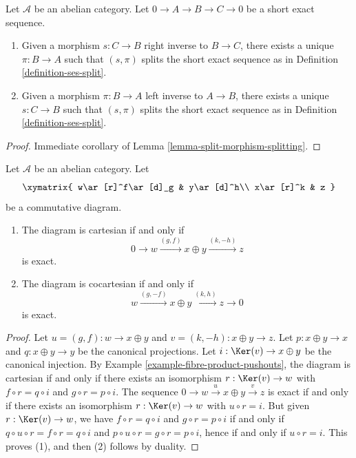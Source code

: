\begin{lemma}
\label{lemma-ses-split}
Let $\mathcal{A}$ be an abelian category.
Let $0 \to A \to B \to C \to 0$
be a short exact sequence.
\begin{enumerate}
\item Given a morphism $s : C \to B$ right inverse to
$B \to C$, there exists a unique $\pi : B \to A$
such that $(s, \pi)$ splits the short exact sequence
as in Definition \ref{definition-ses-split}.
\item Given a morphism $\pi : B \to A$ left inverse to
$A \to B$, there exists a unique $s : C \to B$
such that $(s, \pi)$ splits the short exact sequence
as in Definition \ref{definition-ses-split}.
\end{enumerate}
\end{lemma}

\begin{proof}
Immediate corollary of Lemma \ref{lemma-split-morphism-splitting}.
\end{proof}

\begin{lemma}
\label{lemma-characterize-cartesian}
Let $\mathcal{A}$ be an abelian category. Let
$$
\xymatrix{
w\ar[r]^f\ar[d]_g
& y\ar[d]^h\\
x\ar[r]^k
& z
}
$$
be a commutative diagram. 
\begin{enumerate}
\item The diagram is cartesian if and only if 
$$
0 \to w \xrightarrow{(g, f)} x \oplus y \xrightarrow{(k, -h)} z
$$
is exact.
\item The diagram is cocartesian if and only if 
$$
w \xrightarrow{(g, -f)} x \oplus y \xrightarrow{(k, h)} z \to 0
$$
is exact.
\end{enumerate}
\end{lemma}

\begin{proof}
Let $u = (g, f) : w \to x \oplus y$ and $v = (k, -h) : x \oplus y \to z$. 
Let $p : x \oplus y \to x$ and $q : x \oplus y \to y$ be the canonical 
projections. Let $i : \Ker(v) \to x \oplus y$ be the canonical 
injection. By Example \ref{example-fibre-product-pushouts}, the diagram is 
cartesian if and only if there exists an isomorphism 
$r : \Ker(v) \to w$ with $f \circ r = q \circ i$ and 
$g \circ r = p \circ i$. The sequence 
$0 \to w \overset{u} \to x \oplus y \overset{v} \to z$ is exact if and 
only if there exists an isomorphism $r : \Ker(v) \to w$ with 
$u \circ r = i$. But given $r : \Ker(v) \to w$, we have 
$f \circ r = q \circ i$ and $g \circ r = p \circ i$ if and 
only if $q \circ u \circ r= f \circ r = q \circ i$ and 
$p \circ u \circ r = g \circ r = p \circ i$, hence if and only if
$u \circ r = i$. This proves (1), and then (2) follows by duality. 
\end{proof}


